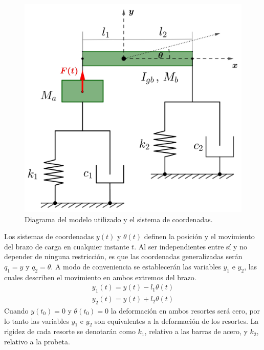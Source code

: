 \begin{figure}[h]
\centering
\includegraphics[scale=0.13]{Imagenes/mach_diagram.jpg}
\caption{Diagrama del modelo utilizado y el sistema de coordenadas.}
\label{fig:diag_modelo}
\end{figure}

Los sistemas de coordenadas $y(t)$ y $\theta (t)$ definen la posición y el movimiento del brazo de carga en cualquier instante $t$. Al ser independientes entre sí y no depender de ninguna restricción, es que las coordenadas generalizadas serán $q_1 = y$ y $q_2 = \theta$. A modo de conveniencia se establecerán las variables $y_1$ e $y_2$, las cuales describen el movimiento en ambos extremos del brazo.
\begin{gather}
	y_1(t) = y(t) - l_1\theta(t) \label{eq:y1}\\
	y_2(t) = y(t) + l_2\theta(t) \label{eq:y2}
\end{gather}
Cuando $y(t_0) = 0$ y $\theta(t_0) = 0$ la deformación en ambos resortes será cero, por lo tanto las variables $y_1$ e $y_2$ son equivalentes a la deformación de los resortes. La rigidez de cada resorte se denotarán como $k_1$, relativo a las barras de acero, y $k_2$, relativo a la probeta.

